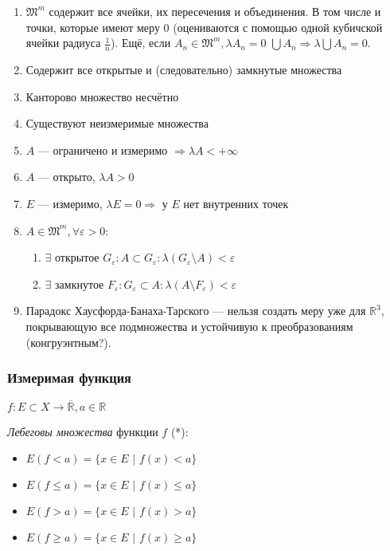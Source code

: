 \documentclass{article}
\def\dbl{\,\,}
\begin{document}
\begin{enumerate}
    \item $\mathfrak{M}^m$ содержит все ячейки, их пересечения и объединения. В том числе и точки, которые имеют меру $0$ (оцениваются с помощью одной кубичской ячейки радиуса $\frac{1}{n}$). Ещё, если $A_n \in \mathfrak{M}^m, \lambda A_n = 0 \dbl \bigcup A_n \Rightarrow \lambda \bigcup A_n = 0$. 
    \item Содержит все открытые и (следовательно) замкнутые множества
    \item Канторово множество несчётно
    \item Существуют неизмеримые множества
    \item $A$ --- ограничено и измеримо $\Rightarrow \lambda A < + \infty$
    \item $A$ --- открыто, $\lambda A > 0$
    \item $E$ --- измеримо, $\lambda E = 0 \Rightarrow$ у $E$ нет внутренних точек
    \item $A \in \mathfrak{M}^m, \forall \varepsilon > 0$:
        \begin{enumerate}
            \item $\exists$ открытое $G_{\varepsilon}: A \subset G_{\varepsilon}: \lambda (G_{\varepsilon} \setminus A) < \varepsilon$
            \item $\exists$ замкнутое $F_{\varepsilon}: G_{\varepsilon} \subset A: \lambda (A \setminus F_{\varepsilon}) < \varepsilon$
        \end{enumerate}

    \item Парадокс Хаусфорда-Банаха-Тарского --- нельзя создать меру уже для $\mathbb{R}^3$, покрывающую все подмножества и устойчивую к преобразованиям (конгруэнтным?).
\end{enumerate}

\subsubsection{Измеримая функция}

$f: E \subset X \rightarrow \overline{\mathbb{R}}, a \in \mathbb{R}$

\textit{Лебеговы множества} функции $f$ (*):

\begin{itemize}
    \item $E(f < a) = \{x \in E \dbl | \dbl f(x) < a\}$
    \item $E(f \le a) = \{x \in E \dbl | \dbl f(x) \le a\}$
    \item $E(f > a) = \{x \in E \dbl | \dbl f(x) > a\}$
    \item $E(f \ge a) = \{x \in E \dbl | \dbl f(x) \ge a\}$
\end{itemize}
\end{document}
